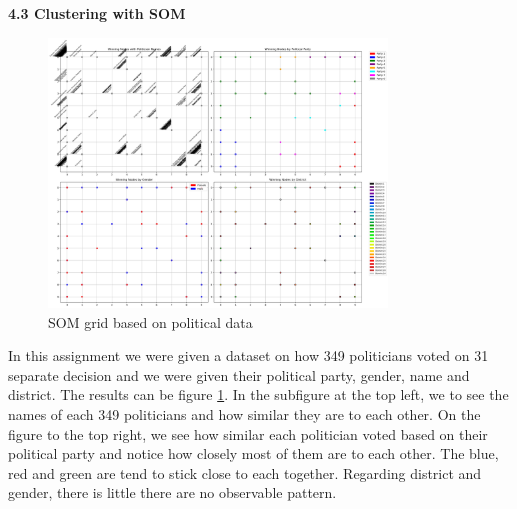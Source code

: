 \documentclass[a4paper]{article}
\begin{document}
\textbf{4.3 Clustering with SOM}
\begin{figure}[htb]
    \centering
    \includegraphics[width=9cm]{Labs/Lab 2/Results/politics_som.png}
    \caption{SOM grid based on political data}
    \label{fig:SOM_politics}
\end{figure}
In this assignment we were given a dataset on how 349 politicians voted on 31 separate decision and we were given their political party, gender, name and district. The results can be figure \ref{fig:SOM_politics}. In the subfigure at the top left, we to see the names of each 349 politicians and how similar they are to each other. On the figure to the top right, we see how similar each politician voted based on their political party and notice how closely most of them are to each other. The blue, red and green are tend to stick close to each together. Regarding district and gender, there is little there are no observable pattern. 
\end{document}
